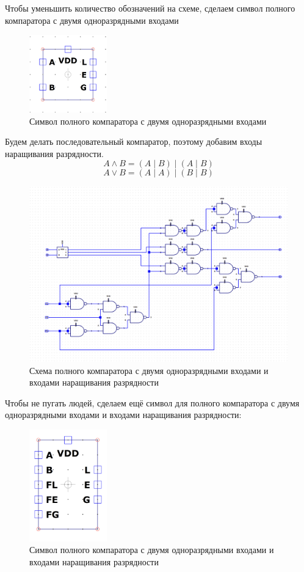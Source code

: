 \documentclass[12pt,onecolumn]{article}
\begin{document}
Чтобы уменьшить количество обозначений на схеме, сделаем символ полного компаратора с двумя одноразрядными входами
\begin{figure}[H]
    \centering
    \includegraphics[width=0.3\textwidth]{image/full-comparator1-sym.png}
    \caption{Символ полного компаратора с двумя одноразрядными входами}
\end{figure}
Будем делать последовательный компаратор, поэтому добавим входы наращивания разрядности.
$$A\wedge B = (A \mid B) \mid (A \mid B)$$
$$A \vee B = (A \mid A) \mid (B \mid B)$$
\begin{figure}
    \centering
    \includegraphics[width=\textwidth]{image/full-comparator-seq.png}
    \caption{Схема полного компаратора с двумя одноразрядными входами и входами наращивания разрядности}
\end{figure}
Чтобы не пугать людей, сделаем ещё символ для полного компаратора с двумя одноразрядными входами и входами наращивания разрядности:
\begin{figure}[H]
    \centering
    \includegraphics[width=0.3\textwidth]{image/full-comparator-seq-sym.png}
    \caption{Символ полного компаратора с двумя одноразрядными входами и входами наращивания разрядности}
\end{figure}
\end{document}
